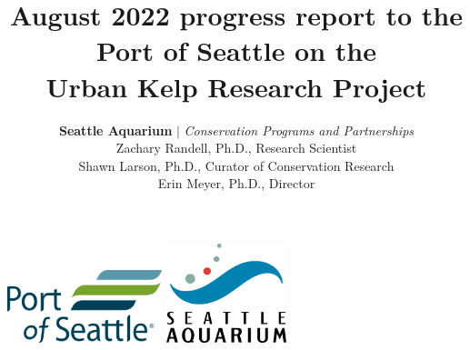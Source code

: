 \documentclass[11pt]{article}
\title{
August 2022 progress report to the Port of Seattle on the
\\
Urban Kelp Research Project
\\
}
\author{
\Large{
\textbf{Seattle Aquarium} 
$\vert$ 
\textit{Conservation Programs and Partnerships}
}
\\
\large{
Zachary Randell, Ph.D., Research Scientist
\\
Shawn Larson, Ph.D., Curator of Conservation Research
\\
Erin Meyer, Ph.D., Director
}
\\
\vspace{10pt}
}
\begin{document}
\begin{titlepage}
\maketitle
\tableofcontents
\vfill

\vspace{20pt}
\centering
\includegraphics[width=4.5cm]{Port_logo.png}
\hspace{20pt}
\includegraphics[width=3.5cm]{logo.jpg}
\\

\end{titlepage}




\end{document}
